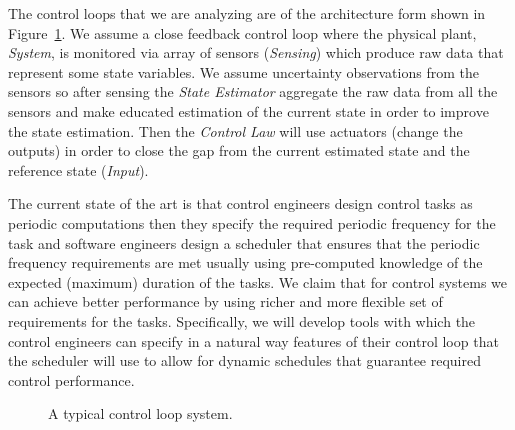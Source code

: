 \documentclass[11pt]{article}
\begin{document}
The control loops that we are analyzing are of the architecture form shown in Figure~\ref{fig:control loop}. 
We assume a close feedback control loop where the physical plant, \textit{System}, is monitored via array of sensors (\textit{Sensing}) which produce raw data that represent some state variables. 
We assume uncertainty observations from the sensors so after sensing the \textit{State Estimator} aggregate the raw data from all the sensors and make educated estimation of the current state in order to improve the state estimation.
Then the \textit{Control Law} will use actuators (change the outputs)  in order to close the gap from the current estimated state and the reference state (\textit{Input}).

The current state of the art is that control engineers design control tasks as periodic computations then they specify the required periodic frequency for the task and software engineers design a scheduler that ensures that the periodic frequency requirements are met usually using pre-computed knowledge of the expected (maximum) duration of the tasks.
We claim that for control systems we can achieve better performance by using richer and more flexible set of requirements for the tasks. Specifically, we will develop tools with which the control engineers can specify in a natural way features of their control loop that the scheduler will use to allow for dynamic schedules that guarantee required control performance. 

\begin{figure}[]
    \centering
    
    
    \caption{A typical control loop system.
    \label{fig:control loop}}
\end{figure}
\end{document}
